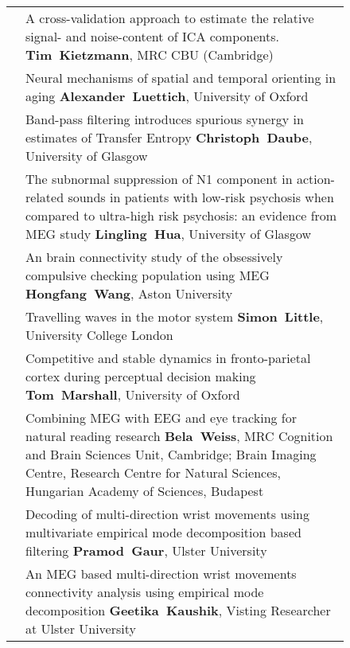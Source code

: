 \begin{figure}[htp]
\begin{tabularx}{\textwidth}{lp{.92\linewidth}}
\cellcolor{set3!50}{\bf B-20} & {\footnotesize A cross-validation approach to estimate the relative signal- and noise-content of ICA components.
} {\bf\footnotesize Tim~Kietzmann}, {\footnotesize MRC CBU (Cambridge)}  \\
\cellcolor{set1!50}{\bf B-21} & {\footnotesize Neural mechanisms of spatial and temporal orienting in aging} {\bf\footnotesize Alexander~Luettich}, {\footnotesize University of Oxford}  \\
\cellcolor{set3!50}{\bf B-22} & {\footnotesize Band-pass filtering introduces spurious synergy in estimates of Transfer Entropy
} {\bf\footnotesize Christoph~Daube}, {\footnotesize University of Glasgow}  \\
\cellcolor{set2!50}{\bf B-23} & {\footnotesize The subnormal suppression of N1 component in action-related sounds in patients with low-risk psychosis when compared to ultra-high risk psychosis: an evidence from MEG study
} {\bf\footnotesize Lingling~Hua}, {\footnotesize University of Glasgow}  \\
\cellcolor{set1!50}{\bf B-24} & {\footnotesize An brain connectivity study of the obsessively compulsive checking population using MEG
} {\bf\footnotesize Hongfang~Wang}, {\footnotesize Aston University}  \\
\cellcolor{set3!50}{\bf B-25} & {\footnotesize Travelling waves in the motor system
} {\bf\footnotesize Simon~Little}, {\footnotesize University College London}  \\
\cellcolor{set1!50}{\bf B-26} & {\footnotesize Competitive and stable dynamics in fronto-parietal cortex during perceptual decision making
} {\bf\footnotesize Tom~Marshall}, {\footnotesize University of Oxford}  \\
\cellcolor{set3!50}{\bf B-27} & {\footnotesize Combining MEG with EEG and eye tracking for natural reading research
} {\bf\footnotesize Bela~Weiss}, {\footnotesize MRC Cognition and Brain Sciences Unit, Cambridge; Brain Imaging Centre, Research Centre for Natural Sciences, Hungarian Academy of Sciences, Budapest}  \\
\cellcolor{set3!50}{\bf B-28} & {\footnotesize Decoding of multi-direction wrist movements using multivariate empirical mode decomposition based filtering
} {\bf\footnotesize Pramod~Gaur}, {\footnotesize Ulster University}  \\
\cellcolor{set3!50}{\bf B-29} & {\footnotesize An MEG based multi-direction wrist movements connectivity analysis using empirical mode decomposition
} {\bf\footnotesize Geetika~Kaushik}, {\footnotesize Visting Researcher at Ulster University}  \\

\end{tabularx}
\end{figure}
